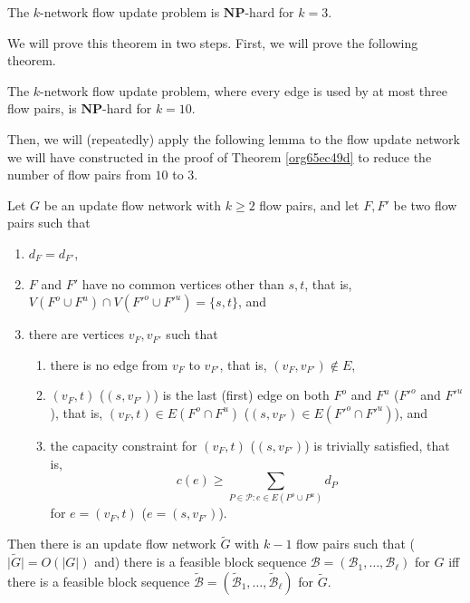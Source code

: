 \documentclass[fontsize=11pt,paper=a4]{book}
\begin{document}
\begin{thm}
The \(k\)-network flow update problem is \(\textbf{NP}\)-hard for \(k=3\).
\label{org2706698}
\end{thm}

We will prove this theorem in two steps.
First, we will prove the following theorem.

\begin{thm}
The \(k\)-network flow update problem, where every edge is used by at most three flow pairs, is \(\textbf{NP}\)-hard for \(k=10\).
\label{org65ec49d}
\end{thm}

Then, we will (repeatedly) apply the following lemma to the flow update network we will have constructed in the proof of Theorem \ref{org65ec49d} to reduce the number of flow pairs from \(10\) to \(3\).

\begin{lem}
Let \(G\) be an update flow network with \(k\geq 2\) flow pairs, and let \(F,F'\) be two flow pairs such that

\begin{enumerate}
\item \label{itm:lem-merging-flow-pairs-property-1}
\(d_F=d_{F'}\),

\item \label{itm:lem-merging-flow-pairs-property-2}
\(F\) and \(F'\) have no common vertices other than \(s,t\), that is, \(V(F^o\cup F^u)\cap V(F'^o\cup F'^u)=\{s,t\}\), and

\item \label{itm:lem-merging-flow-pairs-property-3}
there are vertices \(v_F,v_{F'}\) such that

\begin{enumerate}
\item \label{itm:lem-merging-flow-pairs-property-3-1}
there is no edge from \(v_F\) to \(v_{F'}\), that is, \((v_F,v_{F'})\notin E\),

\item \label{itm:lem-merging-flow-pairs-property-3-2}
\((v_F,t)\) (\((s,v_{F'})\)) is the last (first) edge on both \(F^o\) and \(F^u\) (\(F'^o\) and \(F'^u\)), that is, \((v_F,t)\in E(F^o\cap F^u)\) (\((s,v_{F'})\in E(F'^o\cap F'^u)\)), and

\item \label{itm:lem-merging-flow-pairs-property-3-3}
the capacity constraint for \((v_F,t)\) (\((s,v_{F'})\)) is trivially satisfied, that is,
\[
      c(e)\geq\sum_{P\in\mathcal{P}:e\in E(P^o\cup P^u)}d_P
      \]
for \(e=(v_F,t)\) (\(e=(s,v_{F'})\)).
\end{enumerate}
\end{enumerate}


Then there is an update flow network \(\tilde{G}\) with \(k-1\) flow pairs such that (\(\lvert\tilde{G}\rvert=O(\lvert G\rvert)\) and) there is a feasible block sequence \(\mathcal{B}=(\mathscr{B}_1,\dots,\mathscr{B}_{\ell})\) for \(G\) iff there is a feasible block sequence \(\tilde{\mathcal{B}}=(\tilde{\mathscr{B}}_1,\dots,\tilde{\mathscr{B}}_{\ell})\) for \(\tilde{G}\).
\label{orgce7cb77}
\end{lem}
\end{document}
